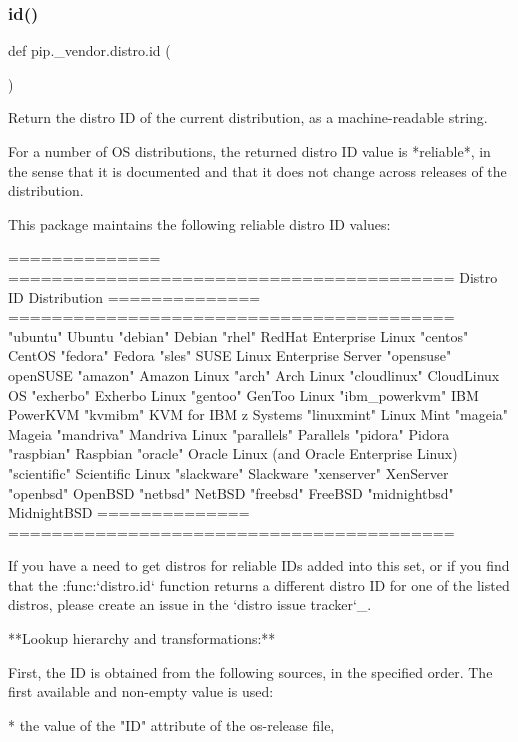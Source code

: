 \subsubsection{\texorpdfstring{id()}{id()}}
{\footnotesize\ttfamily def pip.\+\_\+vendor.\+distro.\+id (\begin{DoxyParamCaption}{ }\end{DoxyParamCaption})}

\begin{DoxyVerb}Return the distro ID of the current distribution, as a
machine-readable string.

For a number of OS distributions, the returned distro ID value is
*reliable*, in the sense that it is documented and that it does not change
across releases of the distribution.

This package maintains the following reliable distro ID values:

==============  =========================================
Distro ID       Distribution
==============  =========================================
"ubuntu"        Ubuntu
"debian"        Debian
"rhel"          RedHat Enterprise Linux
"centos"        CentOS
"fedora"        Fedora
"sles"          SUSE Linux Enterprise Server
"opensuse"      openSUSE
"amazon"        Amazon Linux
"arch"          Arch Linux
"cloudlinux"    CloudLinux OS
"exherbo"       Exherbo Linux
"gentoo"        GenToo Linux
"ibm_powerkvm"  IBM PowerKVM
"kvmibm"        KVM for IBM z Systems
"linuxmint"     Linux Mint
"mageia"        Mageia
"mandriva"      Mandriva Linux
"parallels"     Parallels
"pidora"        Pidora
"raspbian"      Raspbian
"oracle"        Oracle Linux (and Oracle Enterprise Linux)
"scientific"    Scientific Linux
"slackware"     Slackware
"xenserver"     XenServer
"openbsd"       OpenBSD
"netbsd"        NetBSD
"freebsd"       FreeBSD
"midnightbsd"   MidnightBSD
==============  =========================================

If you have a need to get distros for reliable IDs added into this set,
or if you find that the :func:`distro.id` function returns a different
distro ID for one of the listed distros, please create an issue in the
`distro issue tracker`_.

**Lookup hierarchy and transformations:**

First, the ID is obtained from the following sources, in the specified
order. The first available and non-empty value is used:

* the value of the "ID" attribute of the os-release file,


\end{DoxyVerb}
